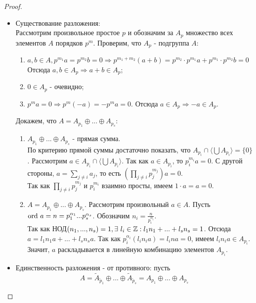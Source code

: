 \begin{proof}\tab
    \begin{itemize}
        \item Существование разложения:\\
        Рассмотрим произвольное простое $p$ и обозначим за $A_p$ множество всех элементов $A$ порядков $p^m$. Проверим, что $A_p$ - подгруппа $A$:
        \begin{enumerate}
            \item $a, b \in A, p^{m_1}a = p^{m_2}b = 0 \Longrightarrow p^{m_1 + m_2}(a+b) = p^{m_2}\cdot p^{m_1}a + p^{m_1}\cdot p^{m_2}b = 0$
            Отсюда $a, b \in A_p \Longrightarrow a+b \in A_p$;
            \item $0 \in A_p$ - очевидно;
            \item $p^ma = 0 \Longrightarrow p^m(-a) = -p^ma = 0$. Отсюда $a\in A_p \Longrightarrow -a \in A_p$.
        \end{enumerate}
        Докажем, что $A = A_{p_1} \oplus ... \oplus A_{p_s}$:
        \begin{enumerate}
            \item $A_{p_1} \oplus ... \oplus A_{p_s}$ - прямая сумма.\\
            По критерию прямой суммы достаточно показать, что $A_{p_i} \cap \langle \bigcup A_{p_i} \rangle = \{0\}$. Рассмотрим $a \in A_{p_i} \cap \langle \bigcup A_{p_i} \rangle$. Так как $a \in A_{p_i}$, то $p_i^{m_i}a = 0$. С другой стороны, $a = \sum \limits_{j \neq i} a_j$, то есть $(\prod \limits_{j \neq i} p_j^{m_j})a = 0$.\\
            Так как $\prod \limits_{j \neq i} p_j^{m_j}$ и $p_i^{m_i}$ взаимно просты, имеем $1 \cdot a = a = 0$.
            \item $A = A_{p_1} \oplus ... \oplus A_{p_s}$.
            Рассмотрим произвольный $a \in A$. Пусть $\textup{ord } a = n = p_1^{\alpha_1}...p_s^{\alpha_s}$. Обозначим $n_i = \frac{n}{p_i^{\alpha_i}}$.\\
            Так как НОД$(n_1,...,n_s) = 1, \exists\ l_i \in \mathbb{Z}: l_1n_1 + ... + l_sn_s = 1$.
            Отсюда $a = l_1n_1a + ... + l_sn_sa$. Так как $p_i^{\alpha_i}(l_in_ia) = l_ina = 0$, имеем $l_in_ia \in A_{p_i}$. Значит, $a$ раскладывается в линейную комбинацию элементов $A_{p_i}$.
        \end{enumerate} 
        \item Единственность разложения - от противного: пусть
        \[A = \tilde{A}_{\tilde{p}_1} \oplus ... \oplus \tilde{A}_{\tilde{p}_s} = A_{p_1} \oplus ... \oplus A_{p_s}\]

\end{itemize}
\end{proof}

